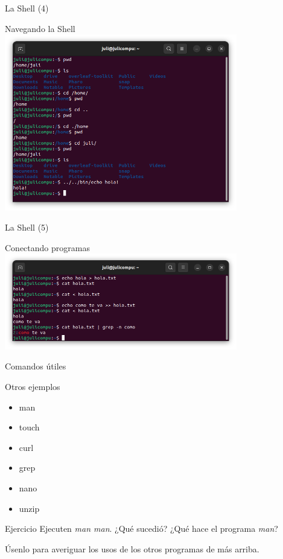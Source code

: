 \begin{frame}{La Shell (4)}
\begin{block}{Navegando la Shell}
        \vspace{-0.3cm}
        \centering
        \includegraphics[width=4in]{images/bash-3.png}
\end{block}
\end{frame}

\begin{frame}{La Shell (5)}
\begin{block}{Conectando programas}
        \centering
        \includegraphics[width=4in]{images/bash-4.png}
\end{block}
\end{frame}

\begin{frame}{Comandos útiles}

\begin{block} {Otros ejemplos}
        \begin{itemize}
        \item man
        \item touch
        \item curl
        \item grep
        \item nano
        \item unzip
    \end{itemize}
\end{block}

    \begin{ejercicio}{Ejercicio}
        Ejecuten \textit{man man}. ¿Qué sucedió? ¿Qué hace el programa \textit{man}?

        Úsenlo para averiguar los usos de los otros programas de más arriba.

    \end{ejercicio}
    
\end{frame}
